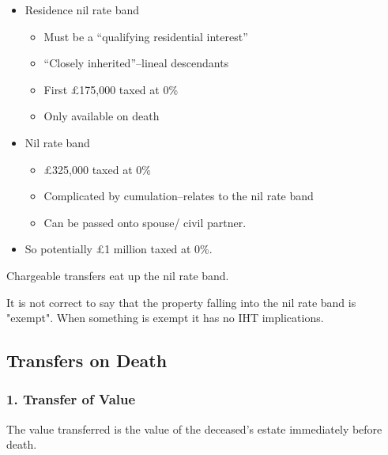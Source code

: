 \documentclass[
]{article}
\newenvironment{Shaded}{}{}
\newcommand{\NormalTok}[1]{#1}
\providecommand{\tightlist}{%
  \setlength{\itemsep}{0pt}\setlength{\parskip}{0pt}}
\begin{document}
\begin{enumerate}
  \begin{itemize}
  \tightlist
  \item
    Residence nil rate band

    \begin{itemize}
    \tightlist
    \item
      Must be a ``qualifying residential interest''
    \item
      ``Closely inherited''--lineal descendants
    \item
      First £175,000 taxed at 0\%
    \item
      Only available on death
    \end{itemize}
  \item
    Nil rate band

    \begin{itemize}
    \tightlist
    \item
      £325,000 taxed at 0\%
    \item
      Complicated by cumulation--relates to the nil rate band
    \item
      Can be passed onto spouse/ civil partner.
    \end{itemize}
  \item
    So potentially £1 million taxed at 0\%.
  \end{itemize}
\end{enumerate}

Chargeable transfers eat up the nil rate band.

\begin{Shaded}
\begin{Highlighting}[]
\NormalTok{It is not correct to say that the property falling into the nil rate band is "exempt". When something is exempt it has no IHT implications.}
\end{Highlighting}
\end{Shaded}

\hypertarget{transfers-on-death}{%
\subsection{Transfers on Death}\label{transfers-on-death}}

\hypertarget{transfer-of-value}{%
\subsubsection{1. Transfer of Value}\label{transfer-of-value}}

The value transferred is the value of the deceased's estate immediately
before death.
\end{document}
